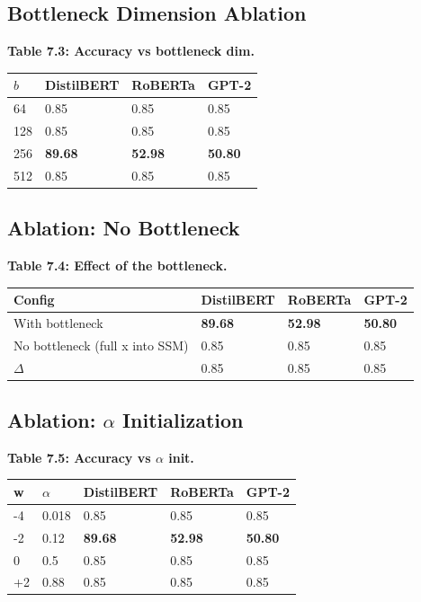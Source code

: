 \subsection{Bottleneck Dimension Ablation}

\textbf{Table 7.3: Accuracy vs bottleneck dim.}

\begin{table}[H]
\centering
\small
\begin{tabular}{llll}
\toprule
\textbf{$b$} & \textbf{DistilBERT} & \textbf{RoBERTa} & \textbf{GPT-2} \\
\midrule
64 & 0.85 & 0.85 & 0.85 \\
128 & 0.85 & 0.85 & 0.85 \\
256 & \textbf{89.68} & \textbf{52.98} & \textbf{50.80} \\
512 & 0.85 & 0.85 & 0.85 \\
\bottomrule
\end{tabular}
\end{table}

\subsection{Ablation: No Bottleneck}

\textbf{Table 7.4: Effect of the bottleneck.}

\begin{table}[H]
\centering
\small
\begin{tabular}{llll}
\toprule
\textbf{Config} & \textbf{DistilBERT} & \textbf{RoBERTa} & \textbf{GPT-2} \\
\midrule
With bottleneck & \textbf{89.68} & \textbf{52.98} & \textbf{50.80} \\
No bottleneck (full x into SSM) & 0.85 & 0.85 & 0.85 \\
$\Delta$ & 0.85 & 0.85 & 0.85 \\
\bottomrule
\end{tabular}
\end{table}

\subsection{Ablation: $\alpha$ Initialization}

\textbf{Table 7.5: Accuracy vs $\alpha$ init.}

\begin{table}[H]
\centering
\small
\begin{tabular}{lllll}
\toprule
\textbf{w} & \textbf{$\alpha$} & \textbf{DistilBERT} & \textbf{RoBERTa} & \textbf{GPT-2} \\
\midrule
-4 & 0.018 & 0.85 & 0.85 & 0.85 \\
-2 & 0.12 & \textbf{89.68} & \textbf{52.98} & \textbf{50.80} \\
0 & 0.5 & 0.85 & 0.85 & 0.85 \\
+2 & 0.88 & 0.85 & 0.85 & 0.85 \\
\bottomrule
\end{tabular}
\end{table}

